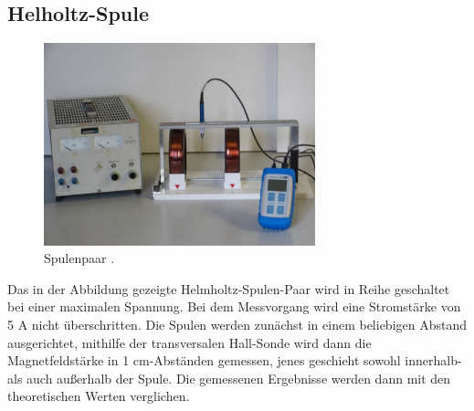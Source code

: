 \subsection{Helholtz-Spule}
\begin{figure}
    \caption{Spulenpaar \cite{anleitung1}.}
    \centering
    \includegraphics[width=0.7\textwidth]{"Bilder/helmholtz.jpg"}
\end{figure}
\noindent Das in der Abbildung gezeigte Helmholtz-Spulen-Paar wird in Reihe 
geschaltet bei einer maximalen Spannung. Bei dem Messvorgang wird eine Stromstärke 
von 5 A nicht überschritten. Die Spulen werden zunächst in einem beliebigen Abstand 
ausgerichtet, mithilfe der transversalen Hall-Sonde wird dann die Magnetfeldstärke
in 1 cm-Abständen gemessen, jenes geschieht sowohl innerhalb-als auch außerhalb 
der Spule. Die gemessenen Ergebnisse werden dann mit den theoretischen Werten 
verglichen.